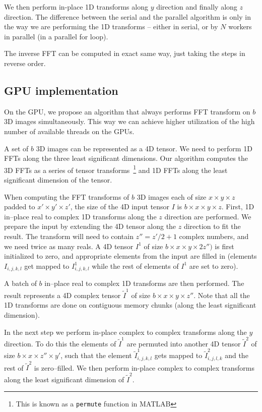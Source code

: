 \documentclass[conference]{IEEEtran}
\begin{document}
  We then perform in-place 1D transforms along $y$ direction and
  finally along $z$ direction.  The difference between the serial and
  the parallel algorithm is only in the way we are performing the 1D
  transforms -- either in serial, or by $N$ workers in parallel (in a
  parallel for loop).

  The inverse FFT can be computed in exact same way, just taking the
  steps in reverse order.

\subsection{GPU implementation}

\label{sec:gpu-fft-impl}

  On the GPU, we propose an algorithm that always performs FFT
  transform on $b$ 3D images simultaneously.  This way we can achieve
  higher utilization of the high number of available threads on the
  GPUs.

  A set of $b$ 3D images can be represented as a 4D tensor.  We need
  to perform 1D FFTs along the three least significant dimensions.
  Our algorithm computes the 3D FFTs as a series of tensor
  transforms~\footnote{This is known as a \texttt{permute} function in
    MATLAB} and 1D FFTs along the least significant dimension of the
  tensor.

  When computing the FFT transforms of $b$ 3D images each of size $x
  \times y \times z$ padded to $x' \times y' \times z'$, the size of
  the 4D input tensor $I$ is $b \times x \times y \times z$.  First,
  1D in--place real to complex 1D transforms along the $z$ direction
  are performed. We prepare the input by extending the 4D tensor along
  the $z$ direction to fit the result.  The transform will need to
  contain $z'' = z' / 2 + 1$ complex numbers, and we need twice as
  many reals.  A 4D tensor $I^1$ of size $b \times x \times y \times
  2z'')$ is first initialized to zero, and appropriate elements from
  the input are filled in (elements $I_{i,j,k,l}$ get mapped to
  $I^1_{i,j,k,l}$ while the rest of elements of $I^1$ are set to
  zero).

  A batch of $b$ in--place real to complex 1D transforms are then
  performed.  The result represents a 4D complex tensor
  $\widetilde{I}^1$ of size $b \times x \times y \times z''$.  Note
  that all the 1D transforms are done on contiguous memory chunks
  (along the least significant dimension).

  In the next step we perform in-place complex to complex transforms
  along the $y$ direction.  To do this the elements of
  $\widetilde{I}^1$ are permuted into another 4D tensor
  $\widetilde{I}^2$ of size $b \times x \times z'' \times y'$, such
  that the element $\widetilde{I}^1_{i,j,k,l}$ gets mapped to
  $\widetilde{I}^2_{i,j,l,k}$ and the rest of $\widetilde{I}^2$ is
  zero--filled.  We then perform in-place complex to complex
  transforms along the least significant dimension of
  $\widetilde{I}^2$.
\end{document}
